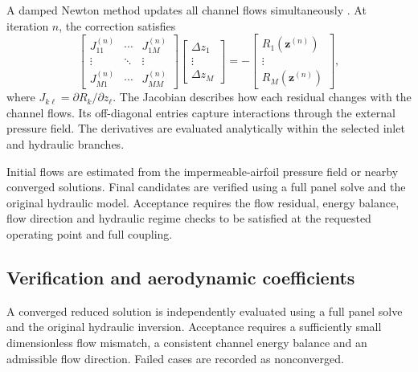 \documentclass[a4paper,fleqn]{cas-dc}
\begin{document}
A damped Newton method updates all channel flows
simultaneously \cite{NocedalWright2006NumericalOptimization}.
At iteration $n$, the correction satisfies
\begin{equation}
	\begin{bmatrix}
		J_{11}^{(n)} & \cdots & J_{1M}^{(n)}\\
		\vdots      & \ddots & \vdots\\
		J_{M1}^{(n)} & \cdots & J_{MM}^{(n)}
	\end{bmatrix}
	\begin{bmatrix}
		\Delta z_1\\
		\vdots\\
		\Delta z_M
	\end{bmatrix}
	=
	-
	\begin{bmatrix}
		R_1(\mathbf{z}^{(n)})\\
		\vdots\\
		R_M(\mathbf{z}^{(n)})
	\end{bmatrix},
	\label{eq:newton_system}
\end{equation}
where $J_{k\ell}=\partial R_k/\partial z_\ell$.
The Jacobian describes how each residual changes with the channel flows.
Its off-diagonal entries capture interactions through the external pressure field.
The derivatives are evaluated analytically within the selected inlet and hydraulic branches.

Initial flows are estimated from the impermeable-airfoil pressure field or nearby converged solutions.
Final candidates are verified using a full panel solve and the original hydraulic model.
Acceptance requires the flow residual, energy balance, flow direction and hydraulic regime checks to be satisfied at the requested operating point and full coupling.


\subsection{Verification and aerodynamic coefficients}
\label{subsec:verification_outputs}

A converged reduced solution is independently evaluated
using a full panel solve and the original hydraulic
inversion. Acceptance requires a sufficiently small
dimensionless flow mismatch, a consistent channel energy
balance and an admissible flow direction. Failed cases
are recorded as nonconverged.
\end{document}
